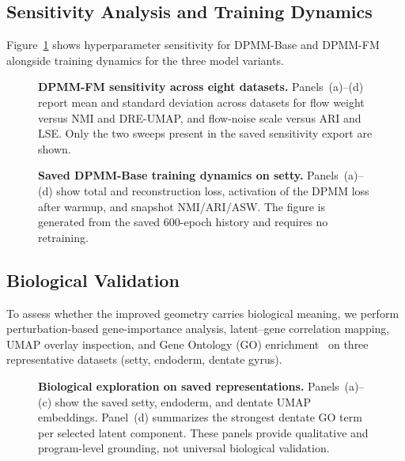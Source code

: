 \documentclass[biology,article,submit,pdftex,moreauthors]{Definitions/mdpi}
\begin{document}
\subsection{Sensitivity Analysis and Training Dynamics}
Figure~\ref{fig:sensitivity} shows hyperparameter sensitivity for DPMM-Base and DPMM-FM alongside training dynamics for the three model variants.

\begin{figure}[H]
\centering

\caption{\textbf{DPMM-FM sensitivity across eight datasets.} Panels~(a)--(d) report mean and standard deviation across datasets for flow weight versus NMI and DRE-UMAP, and flow-noise scale versus ARI and LSE. Only the two sweeps present in the saved sensitivity export are shown.}
\label{fig:sensitivity}
\end{figure}

\begin{figure}[H]
\centering

\caption{\textbf{Saved DPMM-Base training dynamics on setty.} Panels~(a)--(d) show total and reconstruction loss, activation of the DPMM loss after warmup, and snapshot NMI/ARI/ASW. The figure is generated from the saved 600-epoch history and requires no retraining.}
\label{fig:training}
\end{figure}

\subsection{Biological Validation}
To assess whether the improved geometry carries biological meaning, we perform perturbation-based gene-importance analysis, latent--gene correlation mapping, UMAP overlay inspection, and Gene Ontology (GO) enrichment~\cite{ashburner2000gene} on three representative datasets (setty, endoderm, dentate gyrus).

\begin{figure}[H]
\centering

\caption{\textbf{Biological exploration on saved representations.} Panels~(a)--(c) show the saved setty, endoderm, and dentate UMAP embeddings. Panel~(d) summarizes the strongest dentate GO term per selected latent component. These panels provide qualitative and program-level grounding, not universal biological validation.}
\label{fig:bio}
\end{figure}
\end{document}
